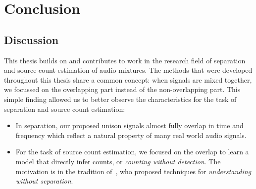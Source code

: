 \chapter{Conclusion}


\section{Discussion}
This thesis builds on and contributes to work in the research field of separation and source count estimation of audio mixtures. The methods that were developed throughout this thesis share a common concept: when signals are mixed together, we focussed on the overlapping part instead of the non-overlapping part. 
This simple finding allowed us to better observe the characteristics for the task of separation and source count estimation:

\begin{itemize}
  \item In separation, our proposed unison signals almost fully overlap in time and frequency which reflect a natural property of many real world audio signals.
  \item For the task of source count estimation, we focused on the overlap to learn a model that directly infer counts, or \emph{counting without detection}. The motivation is in the tradition of~\cite{scheirer99}, who proposed techniques for \emph{understanding without separation}.
\end{itemize}

